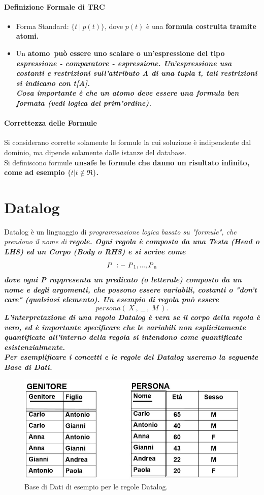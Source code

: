\documentclass[11pt]{article} %
\begin{document}
\paragraph{Definizione Formale di TRC}
\begin{itemize}
\item Forma Standard: \( \{ t\  |\  p(t) \} \), dove \( p(t) \) è una \bf formula \rm costruita tramite \bf atomi\rm.
\item Un \bf atomo\rm\ può essere uno scalare o un'espressione del tipo\\ \it espressione - comparatore - espressione. \rm Un'espressione usa costanti e restrizioni sull'attributo A di una tupla t, tali restrizioni si indicano con t[A].\\
Cosa importante è che un atomo deve essere una \bf formula ben formata \rm (vedi logica del prim'ordine).
\end{itemize}
\paragraph{Correttezza delle Formule}
Si considerano corrette solamente le formule la cui soluzione è indipendente dal dominio, ma dipende solamente dalle istanze del database.\\
Si definiscono formule \bf unsafe \rm le formule che danno un risultato infinito, come ad esempio \( \{ t | t \notin \Re \} \).
\newpage
\section{Datalog}
Datalog è un linguaggio di \it programmazione logica \rm basato su "formule", che prendono il nome di \bf regole\rm. Ogni regola è composta da una Testa (Head o LHS) ed un Corpo (Body o RHS) e si scrive come $$ P\ :-\ P\textsubscript{1}, ... , P\textsubscript{n} $$ dove ogni P rappresenta un \bf predicato \rm (o letterale) composto da un nome e degli argomenti, che possono essere variabili, costanti o "don't care" (qualsiasi elemento). Un esempio di regola può essere $$ persona(\ X\ ,\ \_\_\  ,\ M\ ). $$ L'\bf interpretazione \rm di una regola Datalog è vera se il corpo della regola è vero, ed è importante specificare che le variabili non esplicitamente quantificate all'interno della regola si intendono come quantificate \it esistenzialmente\rm.\\ Per esemplificare i concetti e le regole del Datalog useremo la seguente Base di Dati.
\begin{figure}[htbp]
		\includegraphics{BaseDatiEsempioDatalog.jpg}
	\caption{Base di Dati di esempio per le regole Datalog.}
\end{figure}
\newpage
\end{document}
